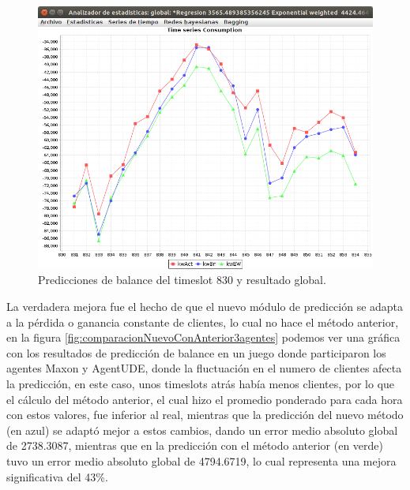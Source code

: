 \begin{figure}[h]
	\centering
	\includegraphics[width=12cm]{img/comparacionNuevoConAnterior1agente.png}
	\caption{Predicciones de balance del timeslot 830 y resultado global. }
	\label{fig:comparacionNuevoConAnterior1agente}
\end{figure}

La verdadera mejora fue el hecho de que el nuevo módulo de predicción se adapta a la pérdida o ganancia constante de clientes, lo cual no hace el método anterior, en la figura \ref{fig:comparacionNuevoConAnterior3agentes} podemos ver una gráfica con los resultados de predicción de balance en un juego donde participaron los agentes Maxon y AgentUDE, donde la fluctuación en el numero de clientes afecta la predicción, en este caso, unos timeslots atrás había menos clientes, por lo que el cálculo del método anterior, el cual hizo el promedio ponderado para cada hora con estos valores,  fue inferior al real, mientras que la predicción del nuevo método (en azul) se adaptó mejor a estos cambios, dando un error medio absoluto global de 2738.3087, mientras que en la predicción con el método anterior (en verde) tuvo un error medio absoluto global de 4794.6719, lo cual representa una mejora significativa del 43\%.

